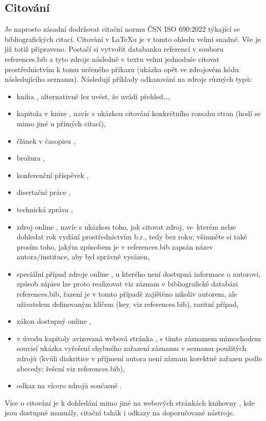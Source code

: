 \subsection{Citování}
Je naprosto zásadní dodržovat citační normu ČSN ISO 690:2022 týkající se bibliografických citací. Citování v \LaTeX{u} je v tomto ohledu velmi snadné. Vše je již totiž připraveno. Postačí si vytvořit databanku referencí v souboru references.bib a tyto zdroje následně v textu velmi jednoduše citovat prostřednictvím k tomu určeného příkazu (ukázka opět ve zdrojovém kódu následujícího seznamu). Následují příklady odkazování na zdroje různých typů:
\begin{itemize}
  \item kniha \citep{HRW1997}, alternativně lez uvést, že \citet{HRW1997} uvádí přehled\dots,
  \item kapitola v knize \citep[s.~243--247]{Delorme2006}, navíc s ukázkou citování konkrétního rozsahu stran (hodí se mimo jiné u přímých citací),
  \item článek v časopisu \citep{Kab2020},
  \item brožura \citep{Farkasova2023},
  \item konferenční příspěvek \citep{Judish1999},
  \item disertační práce \citep{Valente2005},
  \item technická zpráva \citep{Fralick1997},
  \item zdroj online \citep{CVUT2009}, navíc s ukázkou toho, jak citovat zdroj, ve~kterém nelze dohledat rok vydání prostřednictvím b.r., tedy bez roku; všimněte si také prosím toho, jakým způsobem je v references.bib zapsán název autora/instituce, aby byl správně vysázen,
  \item speciální případ zdroje online \citep{ZnalostniInzernyrstvi2019}, u kterého není dostupná informace o autorovi, způsob zápisu lze proto realizovat viz záznam v bibliografické databázi references.bib, řazení je v tomto případě zajištěno nikoliv autorem, ale uživatelem definovaným klíčem (key, viz references.bib), raritní případ,
  \item zákon dostupný online \citep{Zakon239},
  \item v úvodu kapitoly avizovaná webová stránka \citep{ROOT2003}, s tímto záznamem mimochodem souvisí ukázka vyřešení chybného zařazení záznamu v seznamu použitých zdrojů (kvůli diakritice v příjmení autora není záznam korektně zařazen podle abecedy; řešení viz references.bib),
  \item odkaz na vícero zdrojů současně \citep{Fralick1997,Farkasova2023,Valente2005}.
\end{itemize}

\noindent
Více o citování je k dohledání mimo jiné na webových stránkách knihovny \citep{KUTB2024}, kde jsou dostupné manuály, citační tahák i odkazy na doporučované nástroje.


